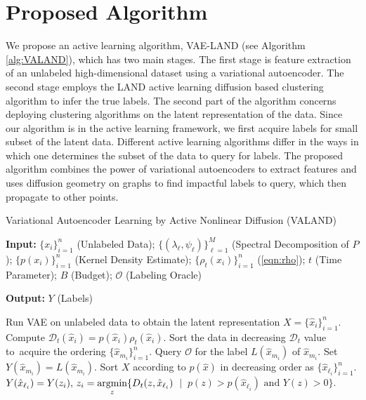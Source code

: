 \documentclass{article}
\newcommand{\argmin}{\operatornamewithlimits{argmin}}%
\def\hx{{\hat x}}
\newcommand{\Dt}{\mathcal{D}_{t}}
\begin{document}
\section{Proposed Algorithm}
\label{sec:ProposedAlgorithm}
We propose an active learning algorithm, VAE-LAND (see Algorithm \ref{alg:VALAND}), which has two main stages. The first stage is feature extraction of an unlabeled high-dimensional dataset using a variational autoencoder. The second stage employs the LAND active learning diffusion based clustering algorithm to infer the true labels.  The second part of the algorithm concerns deploying clustering algorithms on the latent representation of the data. Since our algorithm is in the active learning framework, we first acquire labels for small subset of the latent data. Different active learning algorithms differ in the ways in which one determines the subset of the data to query for labels.  The proposed algorithm combines the power of variational autoencoders to extract features and uses diffusion geometry on graphs to find impactful labels to query, which then propagate to other points. 


\begin{algorithm}[!htb]
	\caption{\label{alg:VALAND}Variational Autoencoder Learning by Active Nonlinear Diffusion (VALAND)}
	\flushleft
	\flushleft
	\textbf{Input:} $\{x_{i}\}_{i=1}^{n}$ (Unlabeled Data); $\{(\lambda_{\ell},\psi_{\ell})\}_{\ell=1}^{M}$ (Spectral Decomposition of $P$); $\{p(x_{i})\}_{i=1}^{n}$ (Kernel Density Estimate);  $\{\rho_{t}(x_{i})\}_{i=1}^{n}$ (\ref{eqn:rho}); $t$ (Time Parameter); $B$ (Budget); $\mathcal{O}$ (Labeling Oracle)
	
	\vspace{5pt}
	
	\textbf{Output:} $Y$ (Labels)
	
		\vspace{5pt}


	\begin{algorithmic}[1]
	\STATE Run VAE on unlabeled data to obtain  the latent representation $X = \{\hx_{i}\}_{i=1}^{n}$.  
	\STATE Compute $\Dt(\hx_{i})=p(\hx_{i})\rho_{t}(\hx_{i})$.  
	\STATE Sort the data in decreasing $\Dt$ value to\ 
	acquire the ordering $\{\hx_{m_{i}}\}_{i=1}^{n}$.
	\STATE Query $\mathcal{O}$ for the label $L(\hx_{m_{i}})$ of $\hx_{m_{i}}$.
	\STATE Set $Y(\hx_{m_{i}})=L(\hx_{m_{i}})$.
	\ENDFOR
	\STATE Sort $X$ according to $p(\hx)$ in decreasing order as $\{\hx_{\ell_{i}}\}_{i=1}^{n}$.  
	\FOR{$i=1:n$}
	\IF{$Y(\hx_{\ell_{i}})=0$}
	\STATE $Y(\hx_{\ell_{i}})=Y(z_{i}), \, z_{i}=\displaystyle\argmin_{z}\{D_{t}(z,\hx_{\ell_{i}})$\ $| \ $ $p(z)>p(\hx_{\ell_{i}}) \text{ and } Y(z)>0\}$.
	\ENDIF
	\ENDFOR
	\end{algorithmic}
\end{algorithm}
\end{document}
